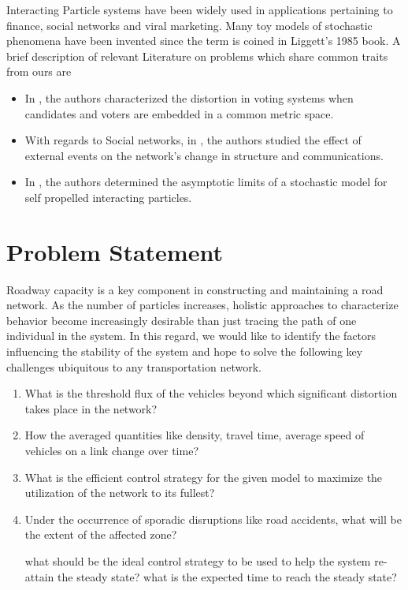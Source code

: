 \documentclass[a4paper,12pt]{scrartcl}
\begin{document}
Interacting Particle systems have been widely used in applications pertaining to finance, social networks and viral marketing.
Many toy models of stochastic phenomena have been invented since the term is coined in Liggett's 1985 book.
\newline
A brief description of relevant Literature on problems which share common traits from ours are 
\begin{itemize}
\item In \cite{ChengCoRR2017}, the authors characterized the distortion in voting systems when candidates and voters are embedded in a common metric space. 

\item With regards to Social networks, in \cite{romeroIWWWC2016}, the authors studied the effect of external events on the network's change in structure and communications.

\item In \cite{carrilloWS2010}, the authors determined the asymptotic limits of a stochastic model for self propelled interacting particles.
\end{itemize}

\section*{Problem Statement}
Roadway capacity is a key component in constructing and maintaining a road network.
As the number of particles increases, holistic approaches to characterize behavior become increasingly desirable than just tracing the path of one individual in the system. 
In this regard, we would like to identify the factors influencing the stability of the system and hope to solve the following key challenges ubiquitous to any transportation network.

\begin{enumerate}
\item What is the threshold flux of the vehicles beyond which significant distortion takes place in the network?

\item How the averaged quantities like density, travel time, average speed of vehicles on a link change over time?

\item What is the efficient control strategy for the given model to maximize the utilization of the network to its fullest?

\item Under the occurrence of sporadic disruptions like road accidents, what will be the extent of the affected zone?

what should be the ideal control strategy to be used to help the system re-attain the steady state? what is the expected time to reach the steady state?

\end{enumerate} 
\end{document}
